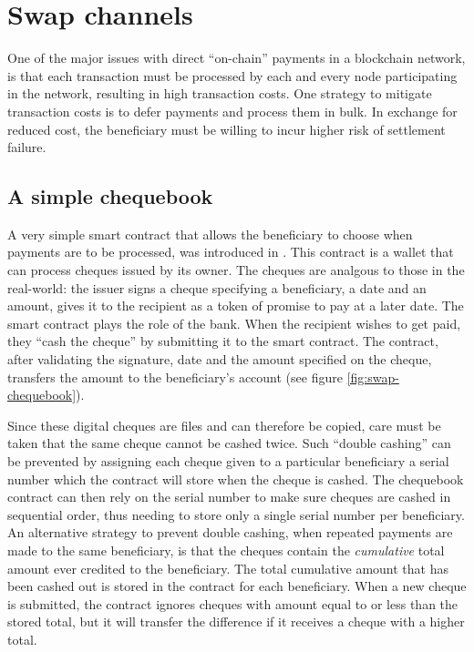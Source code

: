 
\section{Swap channels}

One of the major issues with direct ``on-chain'' payments in a blockchain network, is that each transaction must be processed by each and every node participating in the network, resulting in high transaction costs.
One strategy to mitigate transaction costs is to defer payments and process them in bulk. In exchange for reduced cost, the beneficiary must be willing to incur higher risk of settlement failure.

\subsection{A simple chequebook}\label{subsec:simple-chequebook}

A very simple smart contract that allows the beneficiary to choose when payments are to be processed, was introduced in \cite{ethersphere2016sw3}.
This  contract is a wallet that can process cheques issued by its owner. The cheques are
analgous to those in the real-world: the issuer signs a cheque specifying a beneficiary, a date and an amount,
gives it to the recipient as a token of promise to pay at a later date. The smart contract plays the
role of the bank. When the recipient wishes to get paid, they ``cash the cheque'' by submitting it to the smart contract. The contract, after validating the signature, date and the amount specified on the cheque, transfers the amount to the beneficiary's account (see figure \ref{fig:swap-chequebook}).



Since these digital cheques are files and can therefore be copied, care must be taken that the same cheque cannot be cashed twice. Such ``double cashing'' can be prevented by assigning each cheque given to a particular beneficiary a serial number which the contract will store when the cheque is cashed. The chequebook contract can then rely on the serial number to make sure cheques are cashed in sequential order, thus needing to store only a single serial number per beneficiary.
An alternative strategy to prevent double cashing, when repeated payments are made to the same beneficiary, is that the cheques contain the \emph{cumulative} total amount ever credited to the beneficiary. The total cumulative amount that has been cashed out is stored in the contract for each beneficiary. When a new cheque is submitted, the contract ignores cheques with amount equal to or less than the stored total, but it will transfer the difference if it receives a cheque with a higher total.

